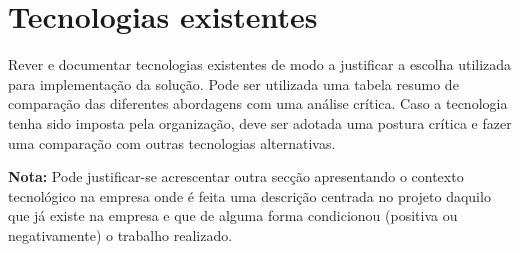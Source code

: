 \section{Tecnologias existentes} %
\label{sec:tecnologias_existentes}

Rever e documentar tecnologias existentes de modo a justificar a escolha utilizada para implementação da solução. Pode ser utilizada uma tabela resumo de comparação das diferentes abordagens com uma análise crítica. Caso a tecnologia tenha sido imposta pela organização, deve ser adotada uma postura crítica e fazer uma comparação com outras tecnologias alternativas.

\textbf{Nota:} Pode justificar-se acrescentar outra secção apresentando o contexto tecnológico na empresa onde é feita uma descrição centrada no projeto daquilo que já existe na empresa e que de alguma forma condicionou (positiva ou negativamente) o trabalho realizado.
